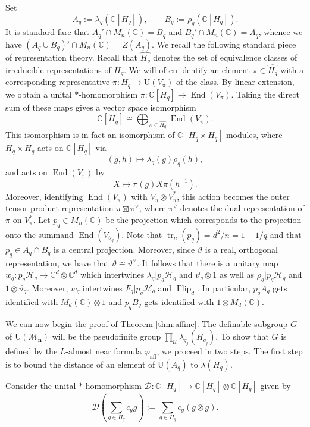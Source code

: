 \documentclass[12pt]{amsart}
\numberwithin{equation}{section}
\theoremstyle{definition}
\newcommand{\C}{\mathbb{C}}
\def\bb{\mathbb}
\def\cal{\mathcal}
\def\M{\mathcal{M}}
\DeclareMathOperator{\tr}{tr}
\newcommand\cU{{\cal U}}
\def \M{\mathcal{M}}
\begin{document}
Set
\[
 A_q:=\lambda_q(\C[H_q]),\qquad B_q:=\rho_q(\C[H_q]). 
\]
It is standard fare that $A_q'\cap M_n(\C)=B_q$ and $B_q'\cap M_n(\C)=A_q$, whence we have $(A_q\cup B_q)'\cap M_n(\bb C)=Z(A_q)$.
We recall the following standard piece of representation
theory. Recall that $\widehat{H_q}$ denotes the set of equivalence classes of irreducible representations of $H_q$.  We will often identify an element $\pi\in\widehat{H_q}$ with a corresponding representative
$\pi:H_q\to\mathrm U(V_\pi)$ of the class.  By linear extension, we obtain a unital
$*$-homomorphism $\pi:\mathbb C[H_q]\to\operatorname{End}(V_\pi)$. 
Taking the direct sum of these maps gives a
vector space isomorphism
\[
\mathbb C[H_q]
\cong
\bigoplus_{\pi\in\widehat{H_q}}
\operatorname{End}(V_\pi).
\]
This isomorphism is in fact an isomorphism
of $\mathbb C[H_q\times H_q]$-modules,
where $H_q\times H_q$ acts on
$\mathbb C[H_q]$ via
\[
(g,h)\longmapsto\lambda_q(g)\rho_q(h),
\]
and acts on $\operatorname{End}(V_\pi)$ by
\[
X\longmapsto\pi(g)X\pi(h^{-1}).
\]
Moreover, identifying
$\operatorname{End}(V_\pi)$ with
$V_\pi\otimes V_\pi^*$, this action becomes
the outer tensor product representation
$\pi\boxtimes\pi^\vee$, where
$\pi^\vee$ denotes the dual
representation of $\pi$ on $V_\pi^*$.
Let $p_q\in M_n(\C)$ be the projection which corresponds to the projection onto the summand $\operatorname{End}(V_{\vartheta_q})$.  Note that $\tr_{n}(p_q)=d^2/n=1-1/q$ and that $p_q\in A_q\cap B_q$ is a central projection.  Moreover, since $\vartheta$ is a real, orthogonal representation, we have that $\vartheta\cong \vartheta^{\vee}$.  It follows that there is a unitary map $w_q\colon p_q\mathcal{H}_q\to \C^d\otimes \C^d$ which intertwines $\lambda_q|p_q\cal H_q$ and $\vartheta_q\otimes 1$ as well as $\rho_q|p_q\cal H_q$ and $1\otimes \vartheta_q$.  Moreover, $w_q$ intertwines $F_q|p_q\cal H_q$ and $\operatorname{Flip}_d$.  In particular, $p_qA_q$ gets identified with $M_d(\C)\otimes 1$ and $p_qB_q$ gets identified with $1\otimes M_d(\C)$.

We can now begin the proof of Theorem \ref{thm:affine}.  The definable subgroup $G$ of $\mathrm{U}(\M_\mathbf{n})$ will be the pseudofinite group $\prod_\cU \lambda_{q_j}(H_{q_j})$.  To show that $G$ is defined by the $L$-almost near formula $\varphi_{\operatorname{aff}}$, we proceed in two steps.  The first step is to bound the distance of an element of $\mathrm{U}(A_q)$ to $\lambda(H_q)$.

Consider the unital $*$-homomorphism $\mathcal D:\bb C[H_q]\to \C[H_q]\otimes \C[H_q]$ given by $$\mathcal D\left(\sum_{g\in H_q} c_g g\right):=\sum_{g\in H_q}c_g(g\otimes g).$$
\end{document}
